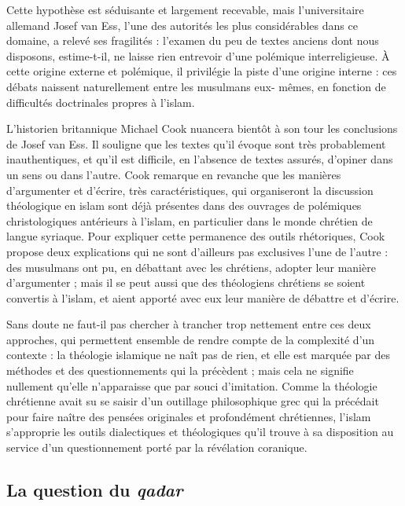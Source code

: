 Cette hypothèse est séduisante et largement recevable, mais
l'universitaire allemand Josef van Ess, l'une des autorités les plus
considérables dans ce domaine, a relevé ses fragilités : l'examen du
peu de textes anciens dont nous disposons, estime-t-il, ne laisse rien
entrevoir d'une polémique interreligieuse. À cette origine externe et
polémique, il privilégie la piste d'une origine interne : ces débats
naissent naturellement entre les musulmans eux- mêmes, en fonction de
difficultés doctrinales propres à l'islam.

L'historien britannique Michael Cook nuancera bientôt à son tour les
conclusions de Josef van Ess. Il souligne que les textes qu'il évoque
sont très probablement inauthentiques, et qu'il est difficile, en
l'absence de textes assurés, d'opiner dans un sens ou dans l'autre. Cook
remarque en revanche que les manières d'argumenter et d'écrire, très
caractéristiques, qui organiseront la discussion théologique en islam
sont déjà présentes dans des ouvrages de polémiques christologiques
antérieurs à l'islam, en particulier dans le monde chrétien de langue
syriaque. Pour expliquer cette permanence des outils rhétoriques, Cook
propose deux explications qui ne sont d'ailleurs pas exclusives l'une de
l'autre : des musulmans ont pu, en débattant avec les chrétiens, adopter
leur manière d'argumenter ; mais il se peut aussi que des théologiens
chrétiens se soient convertis à l'islam, et aient apporté avec eux leur
manière de débattre et d'écrire.


Sans doute ne faut-il pas chercher à trancher trop nettement entre ces
deux
approches, qui permettent ensemble de rendre compte de la complexité
d'un contexte : la
théologie islamique ne naît pas de rien, et elle est marquée par des
méthodes et des questionnements qui la précèdent ; mais cela ne signifie
nullement qu'elle n'apparaisse que par souci d'imitation. Comme la
théologie chrétienne avait su se saisir d'un outillage philosophique
grec qui la précédait pour faire naître des pensées originales et
profondément chrétiennes, l'islam s'approprie les outils dialectiques et
théologiques qu'il trouve à sa disposition au service d'un
questionnement porté par la révélation coranique.

 
  \subsection{La question du \emph{qadar}}
 


